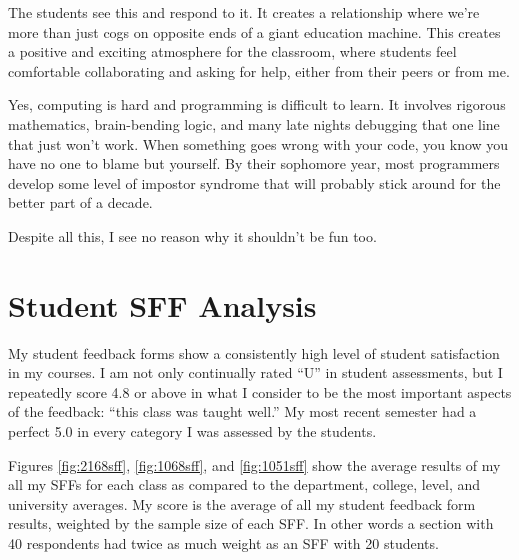 \documentclass[10pt]{article}
\begin{document}
The students see this and respond to it.
It creates a relationship where we're more than just cogs on opposite ends of a giant education machine.
This creates a positive and exciting atmosphere for the classroom, where students feel comfortable collaborating and asking for help, either from their peers or from me.


Yes, computing is hard and programming is difficult to learn.
It involves rigorous mathematics, brain-bending logic, and many late nights debugging that one line that just won't work.
When something goes wrong with your code, you know you have no one to blame but yourself.
By their sophomore year, most programmers develop some level of impostor syndrome that will probably  stick around for the better part of a decade. 

Despite all this, I see no reason why it shouldn't be fun too.


%
%

%
%



\section{Student SFF Analysis}
My student feedback forms show a consistently high level of student satisfaction in my courses.
I am not only continually rated ``U'' in student assessments, but I repeatedly score 4.8 or above in what I consider to be the most important aspects of the feedback:  ``this class was taught well.'' 
My most recent semester had a perfect 5.0 in every category I was assessed by the students.

Figures \ref{fig:2168sff}, \ref{fig:1068sff}, and \ref{fig:1051sff}  show the average results of my all my SFFs for each class as compared to the department, college, level, and university averages.  My score is the average of all my student feedback form results, weighted by the sample size of each SFF. In other words a section with 40 respondents had twice as much weight as an SFF with 20 students.
\end{document}
